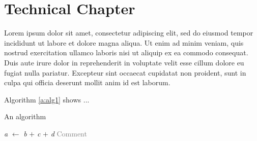 \chapter[Tech chapter]{Technical Chapter} \label{c:tc1} 

Lorem ipsum dolor sit amet, consectetur adipiscing elit, sed do eiusmod tempor incididunt ut labore et dolore magna aliqua. Ut enim ad minim veniam, quis nostrud exercitation ullamco laboris nisi ut aliquip ex ea commodo consequat. Duis aute irure dolor in reprehenderit in voluptate velit esse cillum dolore eu fugiat nulla pariatur. Excepteur sint occaecat cupidatat non proident, sunt in culpa qui officia deserunt mollit anim id est laborum.

Algorithm \ref{a:alg1} shows ...

\begin{algorithm}[!ht]
\caption{An algorithm}\label{a:alg1}
\begin{algorithmic}[1]
\State \textit{a} $\gets$ \textit{b} $+$  \textit{c}  $+$ \textit{d} \Comment \textcolor{gray}{Comment}
\EndFunction

\end{algorithmic}
\end{algorithm}